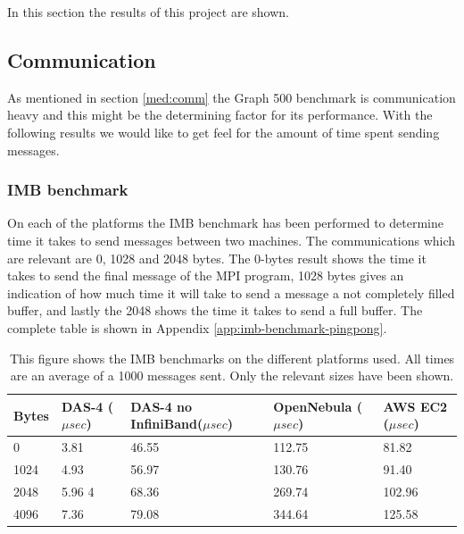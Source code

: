 In this section the results of this project are shown.

\subsection{Communication}
As mentioned in section \ref{med:comm} the Graph 500 benchmark is communication heavy and this might be the determining factor for its performance. With the following results we would like to get feel for the amount of time spent sending messages.

\subsubsection{IMB benchmark}
On each of the platforms the IMB benchmark has been performed to determine time it takes to send messages between two machines. The communications which are relevant are 0, 1028 and 2048 bytes. The 0-bytes result shows the time it takes to send the final message of the MPI program, 1028 bytes gives an indication of how much time it will take to send a message a not completely filled buffer, and lastly the 2048 shows the time it takes to send a full buffer. The complete table is shown in Appendix \ref{app:imb-benchmark-pingpong}.
\begin{table}[!h]
\begin{tabular}{|l|l|l|l|l|}
\hline
Bytes & DAS-4 ($\mu sec$) & DAS-4 no InfiniBand($\mu sec$) & OpenNebula ($\mu sec$) & AWS EC2 ($\mu sec$)\\ \hline
0 & 3.81 &  46.55  & 112.75 &   81.82 \\ \hline
1024 & 4.93 & 56.97  &  130.76 &  91.40  \\ \hline 
2048 & 5.96 4 & 68.36 & 269.74 &  102.96 \\ \hline
4096 & 7.36 & 79.08  & 344.64 &  125.58  \\ \hline 
\end{tabular}
\caption{This figure shows the IMB benchmarks on the different platforms used. All times are an average of a 1000 messages sent. Only the relevant sizes have been shown.}
\label{tab:imb_bench}
\end{table}

